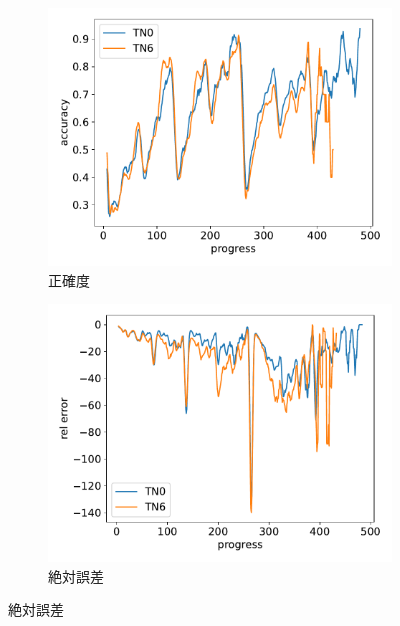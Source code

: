 \begin{figure}[t]
\centering
\begin{subfigure}[b]{0.49\linewidth}
    \includegraphics[width=\linewidth]{pdf/compare/merged_NT8_OI1200_compare/accuracy.pdf}
    \caption{正確度}
    \label{fig:nt8_exp1_accuracy}
\end{subfigure}
\begin{subfigure}[b]{0.49\linewidth}
    \includegraphics[width=\linewidth]{pdf/compare/merged_NT8_OI1200_compare/error_abs.pdf}
    \caption{絶対誤差}
    \label{fig:nt8_exp1_error_abs}
\end{subfigure}

\end{figure}
